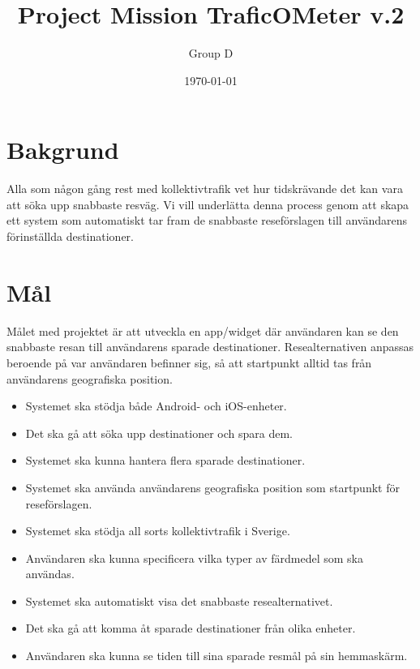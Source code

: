 \documentclass[a4paper]{article}
\title{Project Mission TraficOMeter v.2}
\author{Group D}
\date{\today}
\begin{document}
	\maketitle
	\thispagestyle{empty}
	\setcounter{page}{0}
	\pagebreak
	\tableofcontents
	\pagebreak

	\section{Bakgrund} %
	\label{sec:background}
		Alla som någon gång rest med kollektivtrafik vet hur tidskrävande det kan vara att söka upp
snabbaste resväg. Vi vill underlätta denna process genom att skapa ett system som automatiskt
tar fram de snabbaste reseförslagen till användarens förinställda destinationer.
	

	\section{Mål} %
	\label{sec:m_l}
		Målet med projektet är att utveckla en app/widget där användaren kan se den snabbaste resan till användarens sparade destinationer. Resealternativen anpassas beroende på var användaren befinner sig, så att startpunkt alltid tas från användarens geografiska position.

		\begin{itemize}
			\item Systemet ska stödja både Android- och iOS-enheter.
			\item Det ska gå att söka upp destinationer och spara dem.
			\item Systemet ska kunna hantera flera sparade destinationer.
			\item Systemet ska använda användarens geografiska position som startpunkt för reseförslagen.
			\item Systemet ska stödja all sorts kollektivtrafik i Sverige.
			\item Användaren ska kunna specificera vilka typer av färdmedel som ska användas.
			\item Systemet ska automatiskt visa det snabbaste resealternativet.
			\item Det ska gå att komma åt sparade destinationer från olika enheter.
			\item Användaren ska kunna se tiden till sina sparade resmål på sin hemmaskärm.
		\end{itemize}
\end{document}
